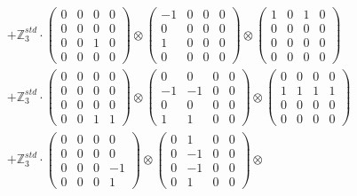 \documentclass{article}
\begin{document}
{\begin{align}
        &+ \label{Rs4-Rc15-Solution-1-c14} \mathbb{Z}_3^{std} \cdot 
            \begin{pmatrix} 0 & 0 & 0 & 0 \\ 0 & 0 & 0 & 0 \\ 0 & 0 & 1 & 0 \\ 0 & 0 & 0 & 0 \end{pmatrix} \otimes 
            \begin{pmatrix} -1 & 0 & 0 & 0 \\ 0 & 0 & 0 & 0 \\ 1 & 0 & 0 & 0 \\ 0 & 0 & 0 & 0 \end{pmatrix} \otimes 
            \begin{pmatrix} 1 & 0 & 1 & 0 \\ 0 & 0 & 0 & 0 \\ 0 & 0 & 0 & 0 \\ 0 & 0 & 0 & 0 \end{pmatrix} \\ 
        &+ \label{Rs4-Rc15-Solution-1-c15} \mathbb{Z}_3^{std} \cdot 
            \begin{pmatrix} 0 & 0 & 0 & 0 \\ 0 & 0 & 0 & 0 \\ 0 & 0 & 0 & 0 \\ 0 & 0 & 1 & 1 \end{pmatrix} \otimes 
            \begin{pmatrix} 0 & 0 & 0 & 0 \\ -1 & -1 & 0 & 0 \\ 0 & 0 & 0 & 0 \\ 1 & 1 & 0 & 0 \end{pmatrix} \otimes 
            \begin{pmatrix} 0 & 0 & 0 & 0 \\ 1 & 1 & 1 & 1 \\ 0 & 0 & 0 & 0 \\ 0 & 0 & 0 & 0 \end{pmatrix} \\ 
        &+ \label{Rs4-Rc15-Solution-1-c16} \mathbb{Z}_3^{std} \cdot 
            \begin{pmatrix} 0 & 0 & 0 & 0 \\ 0 & 0 & 0 & 0 \\ 0 & 0 & 0 & -1 \\ 0 & 0 & 0 & 1 \end{pmatrix} \otimes 
            \begin{pmatrix} 0 & 1 & 0 & 0 \\ 0 & -1 & 0 & 0 \\ 0 & -1 & 0 & 0 \\ 0 & 1 & 0 & 0 \end{pmatrix} \otimes 

\end{align}}
\end{document}
